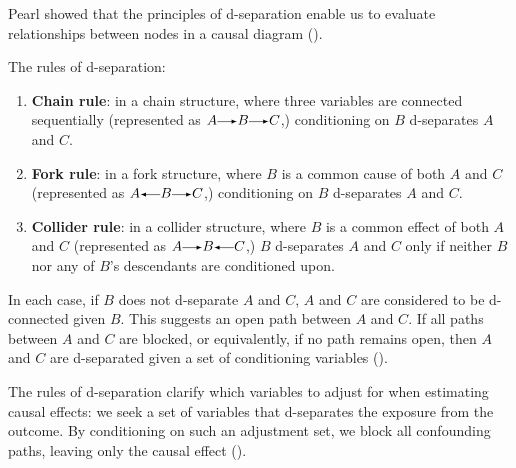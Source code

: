 \documentclass[
  singlecolumn]{article}
\renewcommand{\rightarrow}{\tikz[baseline=-0.5ex] \draw[-latex] (0,0) -- (0.5,0);}
\renewcommand{\leftarrow}{\tikz[baseline=-0.5ex] \draw[latex-] (0,0) -- (0.5,0);}
\begin{document}
Pearl showed that the principles of d-separation enable us to evaluate
relationships between nodes in a causal diagram
().

The rules of d-separation:

\begin{enumerate}
\def\labelenumi{\alph{enumi}.}
\item
  \textbf{Chain rule}: in a chain structure, where three variables are
  connected sequentially (represented as
  \(A \rightarrow B \rightarrow C\),) conditioning on \(B\) d-separates
  \(A\) and \(C\).
\item
  \textbf{Fork rule}: in a fork structure, where \(B\) is a common cause
  of both \(A\) and \(C\) (represented as
  \(A \leftarrow B \rightarrow C\),) conditioning on \(B\) d-separates
  \(A\) and \(C\).
\item
  \textbf{Collider rule}: in a collider structure, where \(B\) is a
  common effect of both \(A\) and \(C\) (represented as
  \(A \rightarrow B \leftarrow C\),) \(B\) d-separates \(A\) and \(C\)
  only if neither \(B\) nor any of \(B\)'s descendants are conditioned
  upon.
\end{enumerate}

In each case, if \(B\) does not d-separate \(A\) and \(C\), \(A\) and
\(C\) are considered to be d-connected given \(B\). This suggests an
open path between \(A\) and \(C\). If all paths between \(A\) and \(C\)
are blocked, or equivalently, if no path remains open, then \(A\) and
\(C\) are d-separated given a set of conditioning variables
().

The rules of d-separation clarify which variables to adjust for when
estimating causal effects: we seek a set of variables that d-separates
the exposure from the outcome. By conditioning on such an adjustment
set, we block all confounding paths, leaving only the causal effect
().
\end{document}

